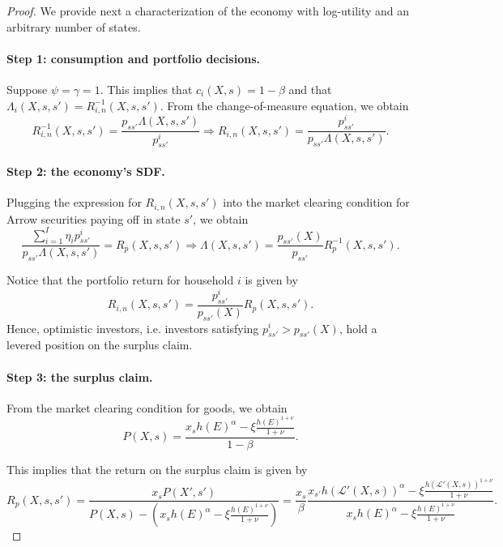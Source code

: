 \begin{proof}
We provide next a characterization of the economy with log-utility and an arbitrary number of states. 

\paragraph{Step 1: consumption and portfolio decisions.} Suppose $\psi = \gamma = 1$. This implies that $c_i(X,s) = 1-\beta$ and that $\Lambda_i(X,s,s') = R_{i,n}^{-1}(X,s,s')$. From the change-of-measure equation, we obtain
\begin{equation}
    R_{i,n}^{-1}(X,s,s') = \frac{p_{ss'} \Lambda(X,s,s')}{p_{ss'}^i} \Rightarrow R_{i,n}(X,s,s') = \frac{p_{ss'}^i}{p_{ss'} \Lambda(X,s,s')}.
\end{equation}

\paragraph{Step 2: the economy's SDF.} 
Plugging the expression for $R_{i,n}(X,s,s')$ into the market clearing condition for Arrow securities paying off in state $s'$, we obtain
\begin{equation}
    \frac{\sum_{i=1}^I \eta_i p_{ss'}^i}{p_{ss'} \Lambda(X,s,s')} = R_p(X,s,s') \Rightarrow
    \Lambda(X,s,s') = \frac{p_{ss'}(X)}{p_{ss'}} R_p^{-1}(X,s,s').
\end{equation}

Notice that the portfolio return for household $i$ is given by
\begin{equation}
    R_{i,n}(X,s,s') = \frac{p_{ss'}^i}{p_{ss'}(X)} R_p(X,s,s').
\end{equation}
Hence, optimistic investors, i.e. investors satisfying $p_{ss'}^i > p_{ss'}(X)$, hold a levered position on the surplus claim. 

\paragraph{Step 3: the surplus claim.} 
From the market clearing condition for goods, we obtain
\begin{equation}
    P(X,s) = \frac{x_s h(E)^\alpha - \xi \frac{h(E)^{1+\nu}}{1+\nu}}{1-\beta}.
\end{equation}

This implies that the return on the surplus claim is given by
\begin{equation}
    R_p(X,s,s') = \frac{x_s P(X',s')}{P(X,s) - \left(x_s h(E)^\alpha - \xi \frac{h(E)^{1+\nu}}{1+\nu}\right)} = \frac{x_s}{\beta} \frac{x_{s'} h(\mathcal{L}'(X,s))^\alpha - \xi \frac{h(\mathcal{L}'(X,s))^{1+\nu}}{1+\nu}}{x_s h(E)^\alpha - \xi \frac{h(E)^{1+\nu}}{1+\nu}}.
\end{equation}


\end{proof}
